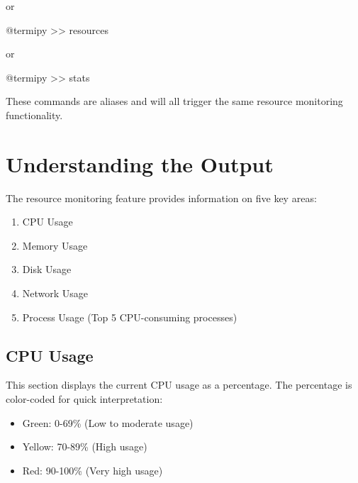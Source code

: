 \documentclass[
  letterpaper,
  DIV=11,
  numbers=noendperiod]{scrreprt}
\newenvironment{Shaded}{\begin{snugshade}}{\end{snugshade}}
\newcommand{\ExtensionTok}[1]{\textcolor[rgb]{0.00,0.23,0.31}{#1}}
\newcommand{\NormalTok}[1]{\textcolor[rgb]{0.00,0.23,0.31}{#1}}
\newcommand{\OperatorTok}[1]{\textcolor[rgb]{0.37,0.37,0.37}{#1}}
\providecommand{\tightlist}{%
  \setlength{\itemsep}{0pt}\setlength{\parskip}{0pt}}\usepackage{longtable,booktabs,array}
\begin{document}
or

\begin{Shaded}
\begin{Highlighting}[]
\ExtensionTok{@termipy} \OperatorTok{\textgreater{}\textgreater{}}\NormalTok{ resources}
\end{Highlighting}
\end{Shaded}

or

\begin{Shaded}
\begin{Highlighting}[]
\ExtensionTok{@termipy} \OperatorTok{\textgreater{}\textgreater{}}\NormalTok{ stats}
\end{Highlighting}
\end{Shaded}

These commands are aliases and will all trigger the same resource
monitoring functionality.

\section*{Understanding the Output}\label{understanding-the-output}


The resource monitoring feature provides information on five key areas:

\begin{enumerate}
\def\labelenumi{\arabic{enumi}.}
\tightlist
\item
  CPU Usage
\item
  Memory Usage
\item
  Disk Usage
\item
  Network Usage
\item
  Process Usage (Top 5 CPU-consuming processes)
\end{enumerate}

\subsection*{CPU Usage}\label{cpu-usage}

This section displays the current CPU usage as a percentage. The
percentage is color-coded for quick interpretation:

\begin{itemize}
\tightlist
\item
  Green: 0-69\% (Low to moderate usage)
\item
  Yellow: 70-89\% (High usage)
\item
  Red: 90-100\% (Very high usage)
\end{itemize}
\end{document}
